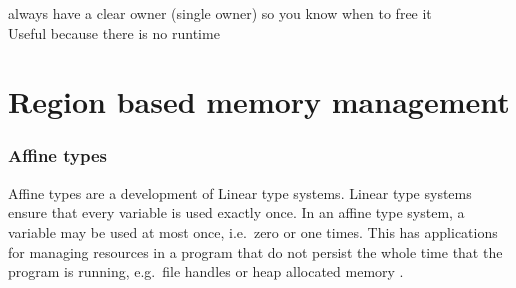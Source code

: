always have a clear owner (single owner) so you know when to free it \\

Useful because there is no runtime \\

\section{Region based memory management}

\subsubsection{Affine types}
Affine types are a development of Linear type systems. Linear type systems
ensure that every variable is used exactly once. In an affine type system, a
variable may be used at most once, i.e.\ zero or one times. This has
applications for managing resources in a program that do not persist the whole
time that the program is running, e.g.\ file handles or heap allocated memory
\cite{attapl} \cite{tovAffine}.

